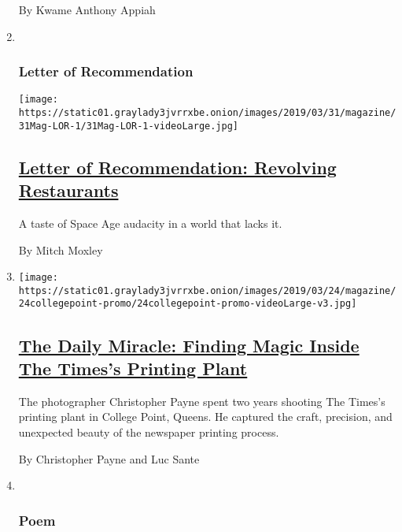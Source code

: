 \begin{enumerate}
  By Kwame Anthony Appiah
\item ~
  \hypertarget{letter-of-recommendation}{%
  \subsubsection{Letter of
  Recommendation}\label{letter-of-recommendation}}

  \texttt{[image: https://static01.graylady3jvrrxbe.onion/images/2019/03/31/magazine/31Mag-LOR-1/31Mag-LOR-1-videoLarge.jpg]}

  \hypertarget{letter-of-recommendation-revolving-restaurants}{%
  \subsection{\texorpdfstring{\href{/2019/03/26/magazine/letter-of-recommendation-revolving-restaurants.html}{Letter
  of Recommendation: Revolving
  Restaurants}}{Letter of Recommendation: Revolving Restaurants}}\label{letter-of-recommendation-revolving-restaurants}}

  A taste of Space Age audacity in a world that lacks it.

  By Mitch Moxley
\item
  \texttt{[image: https://static01.graylady3jvrrxbe.onion/images/2019/03/24/magazine/24collegepoint-promo/24collegepoint-promo-videoLarge-v3.jpg]}

  \hypertarget{the-daily-miracle-finding-magic-inside-the-timess-printing-plant}{%
  \subsection{\texorpdfstring{\href{/2019/03/26/magazine/daily-miracle-times-print-plant-college-point.html}{The
  Daily Miracle: Finding Magic Inside The Times's Printing
  Plant}}{The Daily Miracle: Finding Magic Inside The Times's Printing Plant}}\label{the-daily-miracle-finding-magic-inside-the-timess-printing-plant}}

  The photographer Christopher Payne spent two years shooting The
  Times's printing plant in College Point, Queens. He captured the
  craft, precision, and unexpected beauty of the newspaper printing
  process.

  By Christopher Payne and Luc Sante
\item ~
  \hypertarget{poem}{%
  \subsubsection{Poem}\label{poem}}


\end{enumerate}
